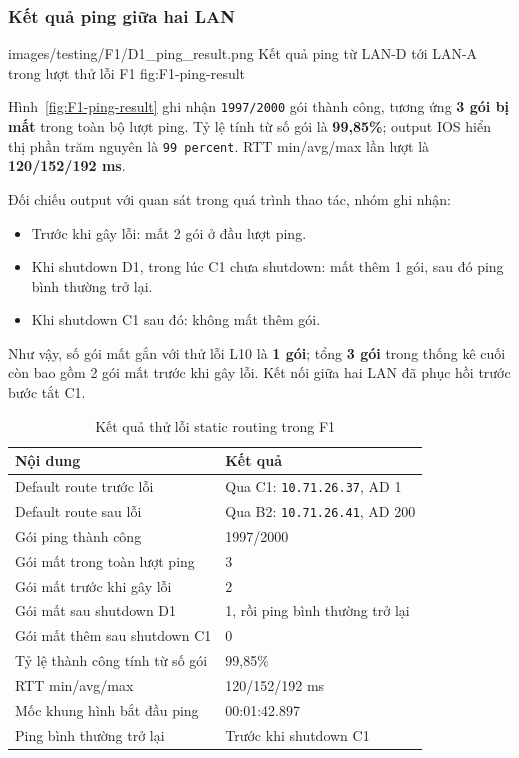 \subsubsection{Kết quả ping giữa hai LAN}

\partzeroimage
{images/testing/F1/D1_ping_result.png}
{Kết quả ping từ LAN-D tới LAN-A trong lượt thử lỗi F1}
{fig:F1-ping-result}

Hình~\ref{fig:F1-ping-result} ghi nhận
\texttt{1997/2000} gói thành công,
tương ứng \textbf{3 gói bị mất} trong toàn bộ lượt ping.
Tỷ lệ tính từ số gói là \textbf{99,85\%};
output IOS hiển thị phần trăm nguyên là \texttt{99 percent}.
RTT min/avg/max lần lượt là \textbf{120/152/192 ms}.

Đối chiếu output với quan sát trong quá trình thao tác,
nhóm ghi nhận:
\begin{itemize}
    \item Trước khi gây lỗi: mất 2 gói ở đầu lượt ping.
    \item Khi shutdown D1, trong lúc C1 chưa shutdown:
    mất thêm 1 gói, sau đó ping bình thường trở lại.
    \item Khi shutdown C1 sau đó: không mất thêm gói.
\end{itemize}

Như vậy, số gói mất gắn với thử lỗi L10 là \textbf{1 gói};
tổng \textbf{3 gói} trong thống kê cuối còn bao gồm
2 gói mất trước khi gây lỗi.
Kết nối giữa hai LAN đã phục hồi trước bước tắt C1.

\begin{table}[H]
\centering
\caption{Kết quả thử lỗi static routing trong F1}
\label{tab:F1-results}
\small
\renewcommand{\arraystretch}{1.3}
\begin{tabularx}{\textwidth}{X l}
\toprule
\textbf{Nội dung} & \textbf{Kết quả} \\
\midrule
Default route trước lỗi & Qua C1: \texttt{10.71.26.37}, AD 1 \\
Default route sau lỗi & Qua B2: \texttt{10.71.26.41}, AD 200 \\
Gói ping thành công & 1997/2000 \\
Gói mất trong toàn lượt ping & 3 \\
Gói mất trước khi gây lỗi & 2 \\
Gói mất sau shutdown D1 & 1, rồi ping bình thường trở lại \\
Gói mất thêm sau shutdown C1 & 0 \\
Tỷ lệ thành công tính từ số gói & 99,85\% \\
RTT min/avg/max & 120/152/192 ms \\
Mốc khung hình bắt đầu ping & 00:01:42.897 \\
Ping bình thường trở lại & Trước khi shutdown C1 \\
\bottomrule
\end{tabularx}
\end{table}


